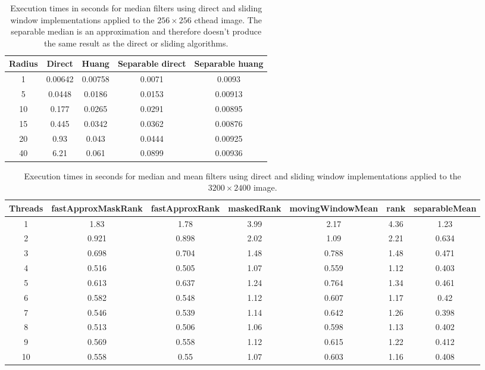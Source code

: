 \documentclass[a4paper]{InsightArticle}
\begin{document}
\begin{table}[phtb]
\centering
\small
\begin{tabular}{ccccc}
\hline
Radius	&	Direct	&	Huang	&	Separable direct	&	Separable huang	\\
\hline
1	&	0.00642	&	0.00758	&	0.0071	&	0.0093	\\
5	&	0.0448	&	0.0186	&	0.0153	&	0.00913	\\
10	&	0.177	&	0.0265	&	0.0291	&	0.00895	\\
15	&	0.445	&	0.0342	&	0.0362	&	0.00876	\\
20	&	0.93	&	0.043	&	0.0444	&	0.00925	\\
40	&	6.21	&	0.061	&	0.0899	&	0.00936	\\
\hline
\hline
\end{tabular}
\caption{Execution times in seconds for median filters using direct and sliding window implementations applied to the $256 \times 256$ cthead image. The separable median is an approximation and therefore doesn't produce the same result as the direct or sliding algorithms.\label{tab:perfRankMedian}}
\end{table}


\begin{table}[phtb]
\centering
\small
\begin{tabular}{ccccccc}
\hline
Threads	&	fastApproxMaskRank	&	fastApproxRank	&	maskedRank	&	movingWindowMean	&	rank	&	separableMean	\\
\hline
1	&	1.83	&	1.78	&	3.99	&	2.17	&	4.36	&	1.23	\\
2	&	0.921	&	0.898	&	2.02	&	1.09	&	2.21	&	0.634	\\
3	&	0.698	&	0.704	&	1.48	&	0.788	&	1.48	&	0.471	\\
4	&	0.516	&	0.505	&	1.07	&	0.559	&	1.12	&	0.403	\\
5	&	0.613	&	0.637	&	1.24	&	0.764	&	1.34	&	0.461	\\
6	&	0.582	&	0.548	&	1.12	&	0.607	&	1.17	&	0.42	\\
7	&	0.546	&	0.539	&	1.14	&	0.642	&	1.26	&	0.398	\\
8	&	0.513	&	0.506	&	1.06	&	0.598	&	1.13	&	0.402	\\
9	&	0.569	&	0.558	&	1.12	&	0.615	&	1.22	&	0.412	\\
10	&	0.558	&	0.55	&	1.07	&	0.603	&	1.16	&	0.408	\\
\hline
\hline
\end{tabular}
\caption{Execution times in seconds for median and mean filters using direct and sliding window implementations applied to the $3200 \times 2400$ image.\label{tab:perfRankThreads}}
\end{table}
\end{document}
